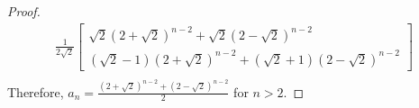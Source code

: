 \begin{proof}
\begin{align}
        \frac{1}{2\sqrt{2}}
        \begin{bmatrix} 
            \sqrt{2}(2+\sqrt{2})^{n-2} + \sqrt{2}(2-\sqrt{2})^{n-2}\\ 
            (\sqrt{2}-1)(2+\sqrt{2})^{n-2} + (\sqrt{2}+1)(2-\sqrt{2})^{n-2}
        \end{bmatrix}\\
    \end{align}
    Therefore, $a_n =  \frac{(2+\sqrt{2})^{n-2} + (2-\sqrt{2})^{n-2}}{2}$ for $n>2$.

\end{proof}
